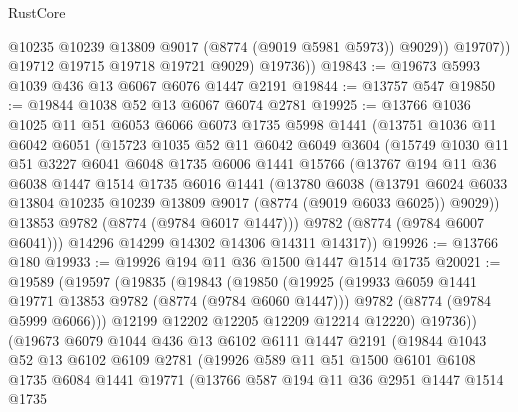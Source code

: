 \begin{lexlean}{RustCore}
\begin{coremodule}
                  @10235
                  @10239
                  @13809
                  @9017
                  (@8774 (@9019 @5981 @5973))
                  @9029))
              @19707))
          @19712
          @19715
          @19718
          @19721
          @9029)
        @19736))
@19843 := @19673 @5993 @1039 @436 @13 @6067 @6076 @1447 @2191
@19844 := @13757 @547
@19850 := @19844 @1038 @52 @13 @6067 @6074 @2781
@19925 := @13766
    @1036
    @1025
    @11
    @51
    @6053
    @6066
    @6073
    @1735
    @5998
    @1441
    (@13751
      @1036
      @11
      @6042
      @6051
      (@15723
        @1035
        @52
        @11
        @6042
        @6049
        @3604
        (@15749
          @1030
          @11
          @51
          @3227
          @6041
          @6048
          @1735
          @6006
          @1441
          @15766
          (@13767
            @194
            @11
            @36
            @6038
            @1447
            @1514
            @1735
            @6016
            @1441
            (@13780
              @6038
              (@13791
                @6024
                @6033
                @13804
                @10235
                @10239
                @13809
                @9017
                (@8774 (@9019 @6033 @6025))
                @9029))
            @13853
            @9782
            (@8774 (@9784 @6017 @1447)))
          @9782
          (@8774 (@9784 @6007 @6041)))
        @14296
        @14299
        @14302
        @14306
        @14311
        @14317))
@19926 := @13766 @180
@19933 := @19926 @194 @11 @36 @1500 @1447 @1514 @1735
@20021 := @19589
    (@19597
      (@19835
        (@19843
          (@19850
            (@19925
              (@19933 @6059 @1441 @19771 @13853 @9782 (@8774 (@9784 @6060 @1447)))
              @9782
              (@8774 (@9784 @5999 @6066)))
            @12199
            @12202
            @12205
            @12209
            @12214
            @12220)
          @19736))
      (@19673
        @6079
        @1044
        @436
        @13
        @6102
        @6111
        @1447
        @2191
        (@19844
          @1043
          @52
          @13
          @6102
          @6109
          @2781
          (@19926
            @589
            @11
            @51
            @1500
            @6101
            @6108
            @1735
            @6084
            @1441
            @19771
            (@13766
              @587
              @194
              @11
              @36
              @2951
              @1447
              @1514
              @1735

\end{coremodule}
\end{lexlean}
